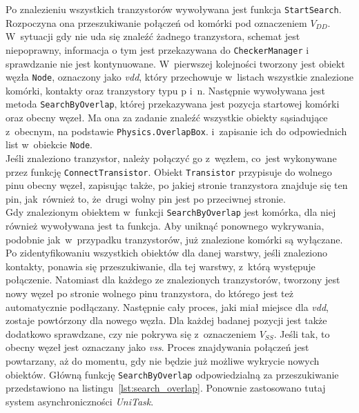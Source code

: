Po znalezieniu wszystkich tranzystorów wywoływana jest funkcja \texttt{StartSearch}.
Rozpoczyna ona przeszukiwanie połączeń od komórki pod oznaczeniem $V_{DD}$.
W~sytuacji gdy nie uda się znaleźć żadnego tranzystora, schemat jest niepoprawny,
informacja o tym jest przekazywana do \texttt{CheckerManager} i sprawdzanie nie jest kontynuowane.
W~pierwszej kolejności tworzony jest obiekt węzła \texttt{Node}, oznaczony jako \textit{vdd},
który przechowuje w~listach wszystkie znalezione komórki,
kontakty oraz tranzystory typu p i~n.
Następnie wywoływana jest metoda \texttt{SearchByOverlap},
której przekazywana jest pozycja startowej komórki oraz obecny węzeł.
Ma ona za zadanie znaleźć wszystkie obiekty sąsiadujące z~obecnym,
na podstawie \texttt{Physics.OverlapBox}.
i~zapisanie ich do odpowiednich list w~obiekcie \texttt{Node}.\\
\indent Jeśli znaleziono tranzystor, należy połączyć go z~węzłem,
co~jest wykonywane przez funkcję \texttt{ConnectTransistor}.
Obiekt \texttt{Transistor} przypisuje do wolnego pinu obecny węzeł,
zapisując także, po jakiej stronie tranzystora znajduje się ten pin,
jak~również to, że~drugi wolny pin jest po przeciwnej stronie.\\
\indent Gdy znalezionym obiektem w~funkcji \texttt{SearchByOverlap} jest komórka,
dla niej również wywoływana jest ta funkcja. %
Aby uniknąć ponownego wykrywania, podobnie jak~w~przypadku tranzystorów,
już znalezione komórki są wyłączane.\\
\indent Po zidentyfikowaniu wszystkich obiektów dla danej warstwy,
jeśli znaleziono kontakty, ponawia się przeszukiwanie, dla tej warstwy, z~którą występuje połączenie.
Natomiast dla każdego ze znalezionych tranzystorów,
tworzony jest nowy węzeł po stronie wolnego pinu tranzystora,
do którego jest też automatycznie podłączany.
Następnie cały proces, jaki miał miejsce dla \textit{vdd}, zostaje powtórzony dla nowego węzła.
Dla każdej badanej pozycji jest także dodatkowo sprawdzane, czy nie pokrywa się z~oznaczeniem $V_{SS}$.
Jeśli tak, to obecny węzeł jest oznaczany jako \textit{vss}.
Proces znajdywania połączeń jest powtarzany, aż do momentu,
gdy nie będzie już możliwe wykrycie nowych obiektów.
Główną funkcję \texttt{SearchByOverlap} odpowiedzialną za przeszukiwanie przedstawiono na listingu~\ref{lst:search_overlap}.
Ponownie zastosowano tutaj system asynchroniczności \textit{UniTask}.\\

